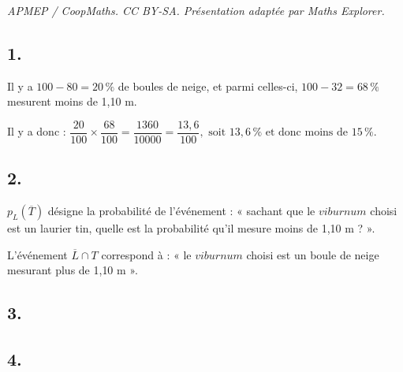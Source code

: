 \documentclass[10pt]{article}
\begin{document}
\noindent\textit{APMEP / CoopMaths. CC BY-SA. Présentation adaptée par Maths Explorer.}\par\medskip
\subsection*{1.}

Il y a \(100 - 80 = 20\,\%\) de boules de neige, et parmi celles-ci, \(100 - 32 = 68\,\%\) mesurent moins de 1{,}10 m.

Il y a donc : \(\dfrac{20}{100} \times \dfrac{68}{100} = \dfrac{1360}{10000} = \dfrac{13,6}{100}, \text{ soit }13{,}6\,\% \text{ et donc moins de } 15\,\%\).

\subsection*{2.}

\(p_L(\overline{T})\) désigne la probabilité de l'événement : « sachant que le \(\textit{viburnum}\) choisi est un laurier tin, quelle est la probabilité qu'il mesure moins de 1{,}10 m ? ».

L'événement \(\overline{L} \cap T\) correspond à : « le \(\textit{viburnum}\) choisi est un boule de neige mesurant plus de 1{,}10 m ».

\subsection*{3.}

\begin{center}
\end{center}

\subsection*{4.}
\end{document}
